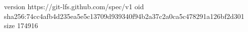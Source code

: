 version https://git-lfs.github.com/spec/v1
oid sha256:74cc4afb4d235ea5e5c13709d939340f94b2a37c2a0ca5c478291a126bf2d301
size 174916
